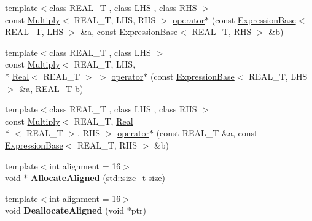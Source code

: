 \begin{DoxyCompactItemize}
\item 
{\footnotesize template$<$class R\+E\+A\+L\+\_\+\+T , class L\+H\+S , class R\+H\+S $>$ }\\const \hyperlink{structatl_1_1_multiply}{Multiply}$<$ R\+E\+A\+L\+\_\+\+T, L\+H\+S, R\+H\+S $>$ \hyperlink{namespaceatl_a6a090f25078201a2e0cfccb2f268d714}{operator$\ast$} (const \hyperlink{structatl_1_1_expression_base}{Expression\+Base}$<$ R\+E\+A\+L\+\_\+\+T, L\+H\+S $>$ \&a, const \hyperlink{structatl_1_1_expression_base}{Expression\+Base}$<$ R\+E\+A\+L\+\_\+\+T, R\+H\+S $>$ \&b)
\item 
{\footnotesize template$<$class R\+E\+A\+L\+\_\+\+T , class L\+H\+S $>$ }\\const \hyperlink{structatl_1_1_multiply}{Multiply}$<$ R\+E\+A\+L\+\_\+\+T, L\+H\+S, \\*
\hyperlink{structatl_1_1_real}{Real}$<$ R\+E\+A\+L\+\_\+\+T $>$ $>$ \hyperlink{namespaceatl_ac91622b33b4bec04c0d565a69cd4f69e}{operator$\ast$} (const \hyperlink{structatl_1_1_expression_base}{Expression\+Base}$<$ R\+E\+A\+L\+\_\+\+T, L\+H\+S $>$ \&a, R\+E\+A\+L\+\_\+\+T b)
\item 
{\footnotesize template$<$class R\+E\+A\+L\+\_\+\+T , class L\+H\+S , class R\+H\+S $>$ }\\const \hyperlink{structatl_1_1_multiply}{Multiply}$<$ R\+E\+A\+L\+\_\+\+T, \hyperlink{structatl_1_1_real}{Real}\\*
$<$ R\+E\+A\+L\+\_\+\+T $>$, R\+H\+S $>$ \hyperlink{namespaceatl_a3bee59e3fc9067b5508bf239ed7681fe}{operator$\ast$} (const R\+E\+A\+L\+\_\+\+T \&a, const \hyperlink{structatl_1_1_expression_base}{Expression\+Base}$<$ R\+E\+A\+L\+\_\+\+T, R\+H\+S $>$ \&b)
\item 
\hypertarget{namespaceatl_aebe487b4ea3e990d22b65f5ce9ce9362}{{\footnotesize template$<$int alignment = 16$>$ }\\void $\ast$ {\bfseries Allocate\+Aligned} (std\+::size\+\_\+t size)}\label{namespaceatl_aebe487b4ea3e990d22b65f5ce9ce9362}

\item 
\hypertarget{namespaceatl_a71b50d58697e828e9846478d44c652ec}{{\footnotesize template$<$int alignment = 16$>$ }\\void {\bfseries Deallocate\+Aligned} (void $\ast$ptr)}\label{namespaceatl_a71b50d58697e828e9846478d44c652ec}


\end{DoxyCompactItemize}
